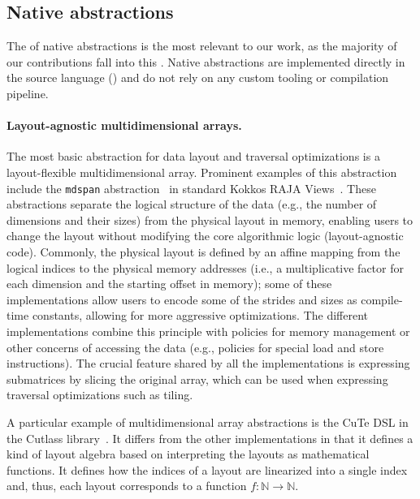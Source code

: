 \subsection{Native abstractions}\label{sec:native}

The  of native abstractions is the most relevant to our work, as the majority of our contributions fall into this . Native abstractions are implemented directly in the source language (\cpp) and do not rely on any custom tooling or compilation pipeline.



\paragraph{Layout-agnostic multidimensional arrays.} The most basic abstraction for data layout and traversal optimizations is a layout-flexible multidimensional array. Prominent examples of this abstraction include the \texttt{mdspan} abstraction~\cite{trott2022mdspan} in standard \cpp {} Kokkos  RAJA Views~\cite{trott2021kokkos,beckingsale2019raja}. These abstractions separate the logical structure of the data (e.g., the number of dimensions and their sizes) from the physical layout in memory, enabling users to change the layout without modifying the core algorithmic logic (layout-agnostic code). Commonly, the physical layout is defined by an affine mapping from the logical indices to the physical memory addresses (i.e., a multiplicative factor for each dimension and the starting offset in memory); some of these implementations allow users to encode some of the strides and sizes as compile-time constants, allowing for more aggressive optimizations. The different implementations combine this principle with policies for memory management or other concerns of accessing the data (e.g., policies for special load and store instructions). The crucial feature shared by all the implementations is expressing submatrices by slicing the original array, which can be used when expressing traversal optimizations such as tiling.

A particular example of multidimensional array abstractions is the CuTe DSL in the Cutlass library~\cite{thakkar2023cutlass}. It differs from the other implementations in that it defines a kind of layout algebra based on interpreting the layouts as mathematical functions. It defines how the indices of a layout are linearized into a single index and, thus, each layout corresponds to a function $f: \mathbb{N} \to \mathbb{N}$.

